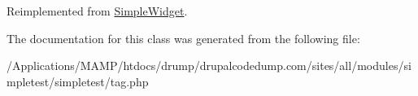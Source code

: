 Reimplemented from \hyperlink{class_simple_widget_a9e048a450e2d29a601e672deda9fa869}{SimpleWidget}.

The documentation for this class was generated from the following file:\begin{DoxyCompactItemize}
\item 
/Applications/MAMP/htdocs/drump/drupalcodedump.com/sites/all/modules/simpletest/simpletest/tag.php\end{DoxyCompactItemize}
